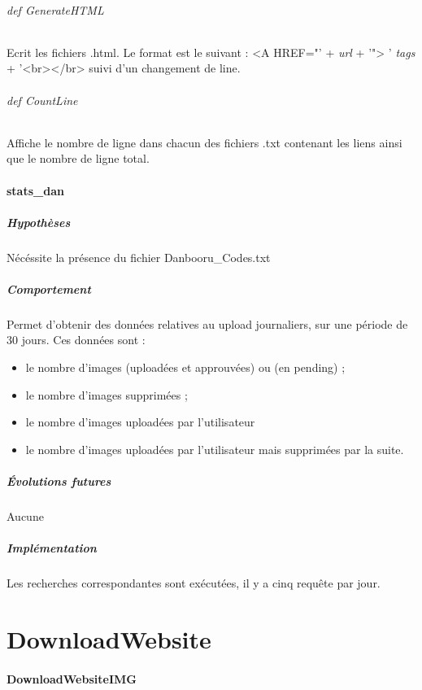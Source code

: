 \documentclass[a4paper,12pt]{article}
\begin{document}
\paragraph{def GenerateHTML}
Ecrit les fichiers .html. Le format est le suivant : \og <A HREF="' + \textit{url} + '"> ' \textit{tags} + '<br></br> \fg{} suivi d'un changement de line.
\paragraph{def CountLine}
Affiche le nombre de ligne dans chacun des fichiers .txt contenant les liens ainsi que le nombre de ligne total.
\subsection{stats\_dan}
\subsubsection{Hypothèses}
Nécéssite la présence du fichier Danbooru\_Codes.txt
\subsubsection{Comportement}
Permet d'obtenir des données relatives au upload journaliers, sur une période de 30 jours. Ces données sont :
\begin{itemize}
\item le nombre d'images (uploadées et approuvées) ou (en pending) ;
\item le nombre d'images supprimées ;
\item le nombre d'images uploadées par l'utilisateur
\item le nombre d'images uploadées par l'utilisateur mais supprimées par la suite.
\end{itemize}
\subsubsection{Évolutions futures}
Aucune
\subsubsection{Implémentation}
Les recherches correspondantes sont exécutées, il y a cinq requête par jour.

\part{DownloadWebsite}
\subsection{DownloadWebsiteIMG}
\end{document}
